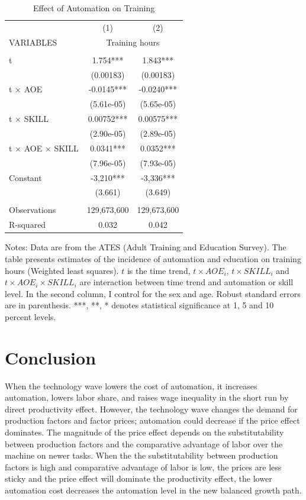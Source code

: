 \documentclass[12pt]{article}
\begin{document}
\begin{table}[h!]
\begin{center}
\scriptsize
\begin{tabular}{lcc} \hline \hline
 & (1) & (2) \\
VARIABLES & \multicolumn{2}{c}{Training hours} \\ \hline
 &  &  \\
t  & 1.754*** & 1.843*** \\
 & (0.00183) & (0.00183) \\
t $\times$ AOE & -0.0145*** & -0.0240*** \\
 & (5.61e-05) & (5.65e-05) \\
t $\times$ SKILL & 0.00752*** & 0.00575*** \\
 & (2.90e-05) & (2.89e-05) \\
t $\times$ AOE $\times$ SKILL & 0.0341*** & 0.0352*** \\
 & (7.96e-05) & (7.93e-05) \\
Constant & -3,210*** & -3,336*** \\
 & (3.661) & (3.649) \\
 &  &  \\
Observations & 129,673,600 & 129,673,600 \\
 R-squared & 0.032 & 0.042 \\ \hline
\end{tabular}
\end{center}
\caption{Effect of Automation on Training}
\label{estimation4}
{\scriptsize Notes: Data are from the ATES (Adult Training and Education Survey). The table presents estimates of the incidence of automation and education on training hours (Weighted least squares). $t$ is the time trend, $t\times AOE_{i}$, $t\times SKILL_{i}$ and $t\times AOE_{i}\times SKILL_{i}$ are interaction between time trend and automation or skill level. In the second column, I control for the sex and age. Robust standard errors are in parenthesis. ***, **, * denotes statistical significance at 1, 5 and 10 percent levels.}
\end{table}

\section{Conclusion}

When the technology wave lowers the cost of automation, it increases automation, lowers labor share, and raises wage inequality in the short run by direct productivity effect. However, the technology wave changes the demand for production factors and factor prices; automation could decrease if the price effect dominates. The magnitude of the price effect depends on the substitutability between production factors and the comparative advantage of labor over the machine on newer tasks. When the the substitutability between production factors is high and comparative advantage of labor is low, the prices are less sticky and the price effect will dominate the productivity effect, the lower automation cost decreases the automation level in the new balanced growth path. 
\end{document}
